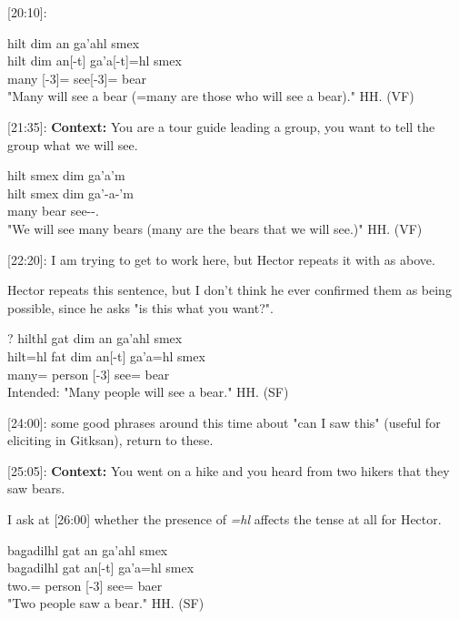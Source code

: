 [20:10]:

\begin{exe}
    \ex \glll
    hilt dim an ga'ahl smex\\
    hilt dim an[-t] ga'a[-t]=hl smex\\
    many \Prosp{} \Ax{}[-3]=\Cn{} see[-3]=\Cn{} bear\\
    \glt "Many will see a bear (=many are those who will see a bear)." \hfill HH.\ElicitationDate{} (VF)
\end{exe}

[21:35]: \textbf{Context: }You are a tour guide leading a group, you want to tell the group what we will see.

\begin{exe}
    \ex \glll
    hilt smex dim ga'a'm\\
    hilt smex dim ga'-a-'m\\
    many bear \Prosp{} see-\Tr{}-\Fpl{}.\Ii{}\\
    \glt "We will see many bears (many are the bears that we will see.)" \hfill HH.\ElicitationDate{} (VF)
\end{exe}

[22:20]: I am trying to get \Ax{} to work here, but Hector repeats it with \Ox{} as above.

Hector repeats this sentence, but I don't think he ever confirmed them as being possible, since he asks "is this what you want?".

\begin{exe}
    \ex \glll
    ? hilthl gat dim an ga'ahl smex\\
    {} hilt=hl fat dim an[-t] ga'a=hl smex\\
    {} many=\Cn{} person \Prosp{} \Ax{}[-3] see=\Cn{} bear\\
    \glt Intended: "Many people will see a bear." \hfill HH.\ElicitationDate{} (SF)
\end{exe}

[24:00]: some good phrases around this time about "can I saw this" (useful for eliciting in Gitksan), return to these.

[25:05]: \textbf{Context: }You went on a hike and you heard from two hikers that they saw bears.

I ask at [26:00] whether the presence of \textit{=hl} affects the tense at all for Hector. 

\begin{exe}
    \ex \glll
    bag̱adilhl gat an ga'ahl smex \\
    bag̱adilhl gat an[-t] ga'a=hl smex\\
    two.\Hum{}=\Cn{} person \Ax{}[-3] see=\Cn{} baer\\
    \glt "Two people saw a bear." \hfill HH.\ElicitationDate{} (SF)
\end{exe}\

